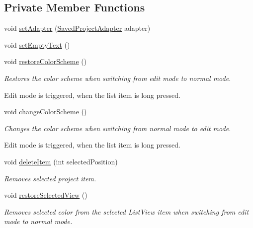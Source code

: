 \subsection*{Private Member Functions}
\begin{DoxyCompactItemize}
\item 
void \hyperlink{classorg_1_1buildmlearn_1_1toolkit_1_1fragment_1_1LoadProjectFragment_ac3e131316171d64afce81960e577d84c}{set\+Adapter} (\hyperlink{classorg_1_1buildmlearn_1_1toolkit_1_1adapter_1_1SavedProjectAdapter}{Saved\+Project\+Adapter} adapter)
\item 
void \hyperlink{classorg_1_1buildmlearn_1_1toolkit_1_1fragment_1_1LoadProjectFragment_a50eba35f3d7070637945578124038117}{set\+Empty\+Text} ()
\item 
void \hyperlink{classorg_1_1buildmlearn_1_1toolkit_1_1fragment_1_1LoadProjectFragment_aa47c5914b681dd6ed2a8cde66303b6d2}{restore\+Color\+Scheme} ()
\begin{DoxyCompactList}\small\item\em Restores the color scheme when switching from edit mode to normal mode. 

Edit mode is triggered, when the list item is long pressed. \end{DoxyCompactList}\item 
void \hyperlink{classorg_1_1buildmlearn_1_1toolkit_1_1fragment_1_1LoadProjectFragment_a8ba9ba23e7a8c2645406063263ded642}{change\+Color\+Scheme} ()
\begin{DoxyCompactList}\small\item\em Changes the color scheme when switching from normal mode to edit mode. 

Edit mode is triggered, when the list item is long pressed. \end{DoxyCompactList}\item 
void \hyperlink{classorg_1_1buildmlearn_1_1toolkit_1_1fragment_1_1LoadProjectFragment_ac2657b452dd8fe89498b20e8b2d5bdce}{delete\+Item} (int selected\+Position)
\begin{DoxyCompactList}\small\item\em Removes selected project item. \end{DoxyCompactList}\item 
void \hyperlink{classorg_1_1buildmlearn_1_1toolkit_1_1fragment_1_1LoadProjectFragment_ac6e61e1cc8dca33378a3dcc7b2fa79e4}{restore\+Selected\+View} ()
\begin{DoxyCompactList}\small\item\em Removes selected color from the selected List\+View item when switching from edit mode to normal mode. \end{DoxyCompactList}\end{DoxyCompactItemize}

